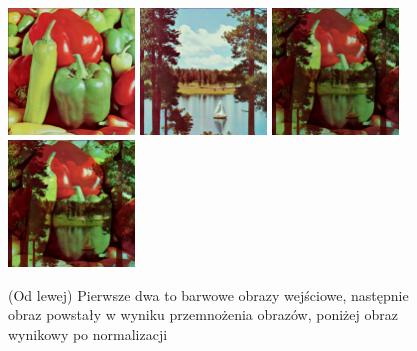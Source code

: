 \documentclass[final,a4paper,openany,12pt]{mwbk}
\begin{document}
\begin{figure}[H]
	\begin{center}
		\includegraphics[width=0.3\textwidth]{1/1Color_Multipl_Img1_Original}
		\includegraphics[width=0.3\textwidth]{1/1Color_Multipl_Img2_Original}
		\includegraphics[width=0.3\textwidth]{1/1Color_Multipl_Img_Result}
		\includegraphics[width=0.3\textwidth]{1/1Color_Multipl_Img_Result_Norm}
	\end{center}
	\caption{(Od lewej) Pierwsze dwa to barwowe obrazy wejściowe, następnie obraz powstały w wyniku przemnożenia obrazów, poniżej obraz wynikowy po normalizacji }
\end{figure}
\end{document}
